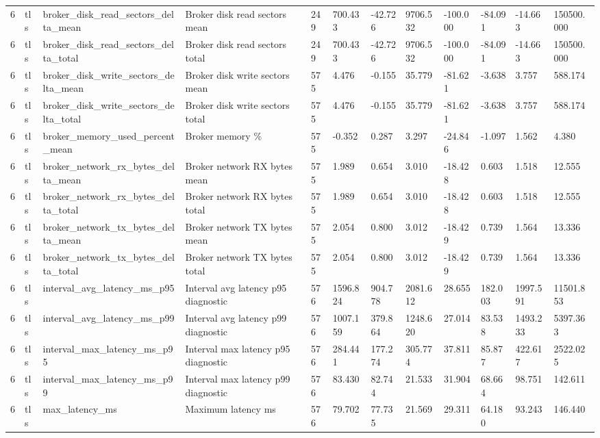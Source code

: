 \begin{longtable}{llllllllllll}
6 & tls & broker\_disk\_read\_sectors\_delta\_mean & Broker disk read sectors mean & 249 & 700.433 & -42.726 & 9706.532 & -100.000 & -84.091 & -14.663 & 150500.000 \\
6 & tls & broker\_disk\_read\_sectors\_delta\_total & Broker disk read sectors total & 249 & 700.433 & -42.726 & 9706.532 & -100.000 & -84.091 & -14.663 & 150500.000 \\
6 & tls & broker\_disk\_write\_sectors\_delta\_mean & Broker disk write sectors mean & 575 & 4.476 & -0.155 & 35.779 & -81.621 & -3.638 & 3.757 & 588.174 \\
6 & tls & broker\_disk\_write\_sectors\_delta\_total & Broker disk write sectors total & 575 & 4.476 & -0.155 & 35.779 & -81.621 & -3.638 & 3.757 & 588.174 \\
6 & tls & broker\_memory\_used\_percent\_mean & Broker memory \% & 575 & -0.352 & 0.287 & 3.297 & -24.846 & -1.097 & 1.562 & 4.380 \\
6 & tls & broker\_network\_rx\_bytes\_delta\_mean & Broker network RX bytes mean & 575 & 1.989 & 0.654 & 3.010 & -18.428 & 0.603 & 1.518 & 12.555 \\
6 & tls & broker\_network\_rx\_bytes\_delta\_total & Broker network RX bytes total & 575 & 1.989 & 0.654 & 3.010 & -18.428 & 0.603 & 1.518 & 12.555 \\
6 & tls & broker\_network\_tx\_bytes\_delta\_mean & Broker network TX bytes mean & 575 & 2.054 & 0.800 & 3.012 & -18.429 & 0.739 & 1.564 & 13.336 \\
6 & tls & broker\_network\_tx\_bytes\_delta\_total & Broker network TX bytes total & 575 & 2.054 & 0.800 & 3.012 & -18.429 & 0.739 & 1.564 & 13.336 \\
6 & tls & interval\_avg\_latency\_ms\_p95 & Interval avg latency p95 diagnostic & 576 & 1596.824 & 904.778 & 2081.612 & 28.655 & 182.003 & 1997.591 & 11501.853 \\
6 & tls & interval\_avg\_latency\_ms\_p99 & Interval avg latency p99 diagnostic & 576 & 1007.159 & 379.864 & 1248.620 & 27.014 & 83.538 & 1493.233 & 5397.363 \\
6 & tls & interval\_max\_latency\_ms\_p95 & Interval max latency p95 diagnostic & 576 & 284.441 & 177.274 & 305.774 & 37.811 & 85.877 & 422.617 & 2522.025 \\
6 & tls & interval\_max\_latency\_ms\_p99 & Interval max latency p99 diagnostic & 576 & 83.430 & 82.744 & 21.533 & 31.904 & 68.664 & 98.751 & 142.611 \\
6 & tls & max\_latency\_ms & Maximum latency ms & 576 & 79.702 & 77.735 & 21.569 & 29.311 & 64.180 & 93.243 & 146.440 \\

\end{longtable}
